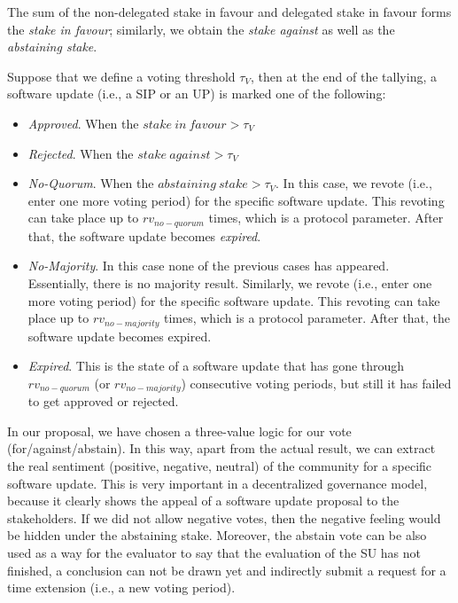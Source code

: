The sum of the non-delegated stake in favour and delegated stake in favour forms the \emph{stake in favour}; similarly, we obtain the \emph{stake against} as well as the \emph{abstaining stake}.

Suppose that we define a voting threshold $\tau_V$, then at the end of the tallying, a software update (i.e., a SIP or an UP) is marked one of the following:
\begin{itemize}

\item \emph{Approved}. When the $stake\ in\ favour > \tau_V$

\item \emph{Rejected}. When the $stake\ against > \tau_V$

\item \emph{No-Quorum}. When the $abstaining\ stake > \tau_V$. In this case, we revote (i.e., enter one more voting period) for the specific software update. This revoting can take place up to $rv_{no-quorum}$ times, which is a protocol parameter. After that, the software update becomes \emph{expired}.

\item \emph{No-Majority}. In this case none of the previous cases has appeared. Essentially, there is no majority result. Similarly, we revote (i.e., enter one more voting period) for the specific software update. This revoting can take place up to $rv_{no-majority}$ times, which is a protocol parameter. After that, the software update becomes expired.

\item \emph{Expired}. This is the state of a software update that has gone through $rv_{no-quorum}$ (or $rv_{no-majority}$) consecutive voting periods, but still it has failed to get approved or rejected.
\end{itemize}

In our proposal, we have chosen a three-value logic for our vote (for/against/abstain). In this way, apart from the actual result, we can extract the real sentiment (positive, negative, neutral) of the community for a specific software update. This is very important in a decentralized governance model, because it clearly shows the appeal of a software update proposal to the stakeholders. If we did not allow negative votes, then the negative feeling would be hidden under the abstaining stake.
Moreover, the abstain vote can be also used as a way for the evaluator to say that the evaluation of the SU has not finished, a conclusion can not be drawn yet and indirectly submit a request for a time extension (i.e., a new voting period).

